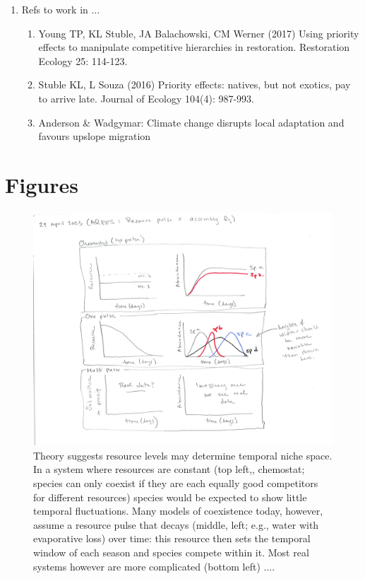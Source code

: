 \documentclass[11pt]{article}
\begin{document}
\begin{enumerate}
\begin{enumerate}
\begin{enumerate}
\end{enumerate}
\end{enumerate}
\item Refs to work in ...
\begin{enumerate}
\item Young TP, KL Stuble, JA Balachowski, CM Werner (2017) Using priority effects to manipulate competitive hierarchies in restoration. Restoration Ecology 25: 114-123.
\item Stuble KL, L Souza (2016) Priority effects: natives, but not exotics, pay to arrive late. Journal of Ecology 104(4): 987-993.
\item Anderson \& Wadgymar: Climate change disrupts local adaptation and favours upslope migration %
\end{enumerate}
\end{enumerate}




\section{Figures}
\begin{figure}[h!]
\centering
\includegraphics[width=1\textwidth]{..//figures/FigResourceApr2023.png}
\caption{Theory suggests resource levels may determine temporal niche space. In a system where resources are constant (top left,, chemostat; species can only coexist if they are each equally good competitors for different resources) species would be expected to show little temporal fluctuations. Many models of coexistence today, however, assume a resource pulse that decays (middle, left; e.g., water with evaporative loss) over time: this resource then sets the temporal window of each season and species compete within it. Most real systems however are more complicated (bottom left) ....}
 \label{fig:resource}
\end{figure}
\end{document}
